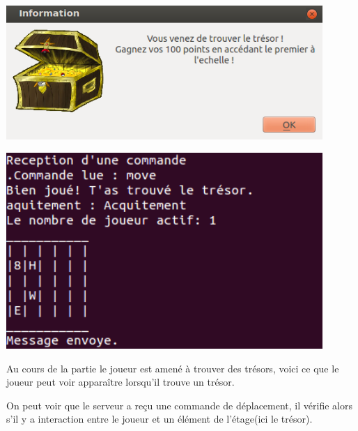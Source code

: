 \documentclass[a4paper,10pt]{article}
\begin{document}
		\begin{minipage}[t]{0.46\textwidth}
			\vspace{20pt}
			\centering
			\includegraphics[width=0.9\textwidth]{JeuxDEssais/Wumpus4.png}
		\end{minipage}
		\hfill
		\begin{minipage}[t]{0.46\textwidth}
			\vspace{2pt}
			\centering
			\includegraphics[width=0.9\textwidth]{JeuxDEssais/Serveur4.png}
		\end{minipage}

		\begin{minipage}[t]{0.46\textwidth}
			\vspace{2pt}
			Au cours de la partie le joueur est amené à trouver des trésors, voici ce que le joueur peut voir apparaître lorsqu'il trouve un trésor.
		\end{minipage}
		\hfill
		\begin{minipage}[t]{0.46\textwidth}
			\vspace{2pt}
			On peut voir que le serveur a reçu une commande de déplacement, il vérifie alors s'il y a interaction entre le joueur et un élément de l'étage(ici
le trésor).
		\end{minipage}\\

\end{document}
